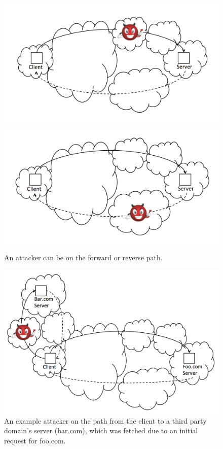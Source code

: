 \begin{figure}
\begin{minipage}[c][11cm][t]{.5\textwidth}
  \centering
  \includegraphics[width=.99\textwidth]{forward_evil}
  \label{fig:forward_attack}\par\vfill
  \includegraphics[width=.99\textwidth]{reverse_evil}
  \label{fig:reverse_attack}
\end{minipage}
\caption{An attacker can be on the forward or reverse path.}
\end{figure}

\begin{figure}
\centering
\includegraphics[width=.5\textwidth]{subsequent_request_attacker}
\caption{An example attacker on the path from the client to a third party domain's server (bar.com), which was fetched due to an initial request for foo.com.}
\label{fig:domains}
\end{figure}

